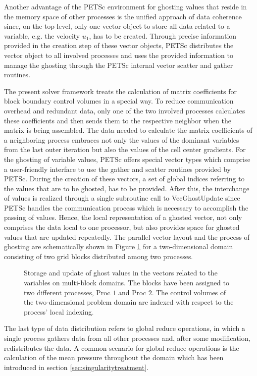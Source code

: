Another advantage of the PETSc environment for ghosting values that reside in the memory space of other processes is the unified approach of data coherence since, on the top level, only one vector object to store all data related to a variable, e.g. the velocity \(u_1\), has to be created. Through precise information provided in the creation step of these vector objects, PETSc distributes the vector object to all involved processes and uses the provided information to manage the ghosting through the PETSc internal vector scatter and gather routines. 

The present solver framework treats the calculation of matrix coefficients for block boundary control volumes in a special way. To reduce communication overhead and redundant data, only one of the two involved processes calculates these coefficients and then sends them to the respective neighbor when the matrix is being assembled. The data needed to calculate the matrix coefficients of a neighboring process embraces not only the values of the dominant variables from the last outer iteration but also the values of the cell center gradients. For the ghosting of variable values, PETSc offers special vector types which comprise a user-friendly interface to use the gather and scatter routines provided by PETSc. During the creation of these vectors, a set of global indices referring to the values that are to be ghosted, has to be provided. After this, the interchange of values is realized through a single subroutine call to \textrm{VecGhostUpdate} since PETSc handles the communication process which is necessary to accomplish the passing of values. Hence, the local representation of a ghosted vector, not only comprises the data local to one processor, but also provides space for ghosted values that are updated repeatedly. The parallel vector layout and the process of ghosting are schematically shown in Figure \ref{fig:ghosting} for a two-dimensional domain consisting of two grid blocks distributed among two processes.

\begin{figure}[h!]
  \centering
  
  \caption{Storage and update of ghost values in the vectors related to the variables on multi-block domains. The blocks have been assigned to two different processes, \textrm{Proc} $1$ and \textrm{Proc} $2$. The control volumes of the two-dimensional problem domain are indexed with respect to the process' local indexing.}
  \label{fig:ghosting}
\end{figure}

The last type of data distribution refers to global reduce operations, in which a single process gathers data from all other processes and, after some modification, redistributes the data. A common scenario for global reduce operations is the calculation of the mean pressure throughout the domain which has been introduced in section \ref{sec:singularitytreatment}.


